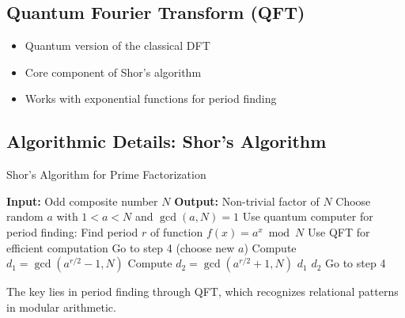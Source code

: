 	\subsection{Quantum Fourier Transform (QFT)}
	
	\begin{itemize}
		\item Quantum version of the classical DFT
		\item Core component of Shor's algorithm
		\item Works with exponential functions for period finding
	\end{itemize}
	
	\subsection{Algorithmic Details: Shor's Algorithm}
	
	\begin{algorithm}[htbp]
		\caption{Shor's Algorithm for Prime Factorization}
		\label{alg:shor}
		\begin{algorithmic}[1]
			\STATE \textbf{Input:} Odd composite number $N$
			\STATE \textbf{Output:} Non-trivial factor of $N$
			\STATE 
			\STATE Choose random $a$ with $1 < a < N$ and $\gcd(a,N) = 1$
			\STATE Use quantum computer for period finding:
			\STATE \quad Find period $r$ of function $f(x) = a^x \bmod N$
			\STATE \quad Use QFT for efficient computation
			\STATE Go to step 4 (choose new $a$)
			\ENDIF
			\STATE Compute $d_1 = \gcd(a^{r/2} - 1, N)$
			\STATE Compute $d_2 = \gcd(a^{r/2} + 1, N)$
			\RETURN $d_1$
			\RETURN $d_2$
			\ELSE
			\STATE Go to step 4
			\ENDIF
		\end{algorithmic}
	\end{algorithm}
	
	The key lies in period finding through QFT, which recognizes relational patterns in modular arithmetic.
	
	\begin{table}[htbp]
		\centering
		\begin{adjustbox}{width=0.85\textwidth}
		\end{adjustbox}
		\caption{Relational algorithms in practice}
		\label{tab:algorithmen}
	\end{table}
	
